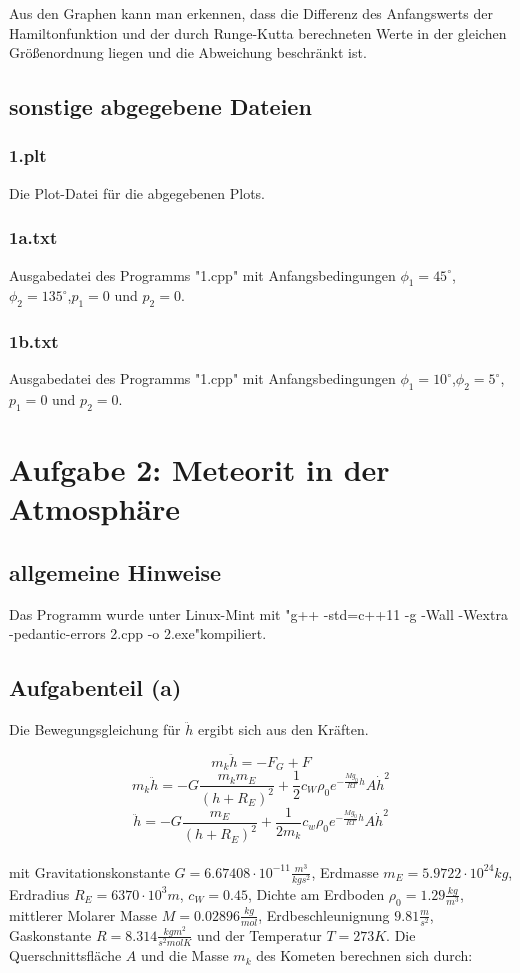 \documentclass{scrreprt}
\begin{document}
Aus den Graphen kann man erkennen, dass die Differenz des Anfangswerts der Hamiltonfunktion und der durch Runge-Kutta berechneten Werte in der gleichen Größenordnung liegen und die Abweichung beschränkt ist.

\section*{sonstige abgegebene Dateien}
\subsection*{1.plt}
Die Plot-Datei für die abgegebenen Plots.
\subsection*{1a.txt}
Ausgabedatei des Programms "1.cpp" mit Anfangsbedingungen $\phi_1=45^\circ$,$\phi_2=135^\circ$,$p_1=0$ und $p_2=0$.
\subsection*{1b.txt}
Ausgabedatei des Programms "1.cpp" mit Anfangsbedingungen $\phi_1=10^\circ$,$\phi_2=5^\circ$,$p_1=0$ und $p_2=0$.

\chapter*{Aufgabe 2: Meteorit in der Atmosphäre}
\section*{allgemeine Hinweise}
Das Programm wurde unter Linux-Mint mit "g++ -std=c++11 -g -Wall -Wextra -pedantic-errors 2.cpp -o 2.exe"\;kompiliert.
\section*{Aufgabenteil (a)}
Die Bewegungsgleichung für $\ddot{h}$ ergibt sich aus den Kräften.

\[m_k \ddot{h}=-F_G+F\]
\[m_k \ddot{h}=-G\frac{m_k m_E}{(h+R_E)^2}+ \frac{1}{2}c_W \rho_0 e^{-\frac{M g_0}{R T}h}A \dot{h}^2\]
\[\ddot{h}=-G \frac{m_E}{(h+R_E)^2}+\frac{1}{2 m_k}c_w \rho_0 e^{-\frac{M g_0}{R T}h}A \dot{h}^2\] \\
mit Gravitationskonstante $G=6.67408 \cdot 10^{-11} \frac{m^3}{kg s^2}$, Erdmasse $m_E=5.9722 \cdot 10^{24} kg$, Erdradius $R_E = 6370 \cdot 10^3 m$, $c_W = 0.45$, Dichte am Erdboden $\rho_0 = 1.29 \frac{kg}{m^3}$, mittlerer Molarer Masse $M = 0.02896 \frac{kg}{mol}$, Erdbeschleunignung $9.81 \frac{m}{s^2}$, Gaskonstante $R=8.314 \frac{kg m^2}{s^2 mol K}$ und der Temperatur $T=273 K$.
Die Querschnittsfläche $A$ und die Masse $m_k$ des Kometen berechnen sich durch:
\end{document}
